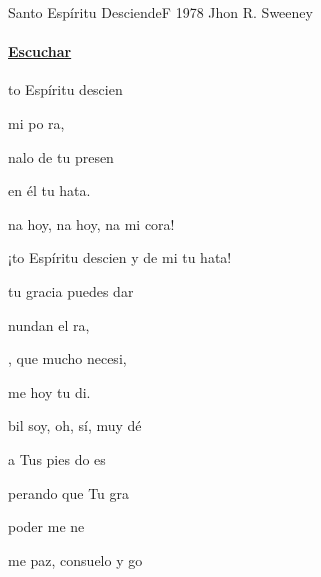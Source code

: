 \documentclass[12pt, spanish]{book}
\begin{document}
    \begin{song}{Santo Espíritu Desciende}{F}
    {1978} %
    {Jhon R. Sweeney}
    {} %
    {}
        \ifChordBk
            \paragraph{\mbox{}\hfill\protect\href{https://open.spotify.com/intl-es/track/4OhyEUIpuxNwBhsmKJCPZU}{Escuchar}\mbox{}\hfill}
        \fi

        \begin{SBOpGroup}
            to Espíritu descien

             mi po ra,

            nalo de tu presen

             en él tu hata.
        \end{SBOpGroup}

        \begin{SBChorus}
            na hoy, na hoy, na  mi cora!

            ¡to Espíritu descien y  de mi tu hata!
        \end{SBChorus}

        \begin{SBOpGroup}
             tu gracia puedes dar

            nundan el ra,

            , que mucho necesi,

            me hoy tu di.
        \end{SBOpGroup}

        \begin{SBOpGroup}
            bil soy, oh, sí, muy dé

             a Tus pies do es

            perando que Tu gra

             poder me ne 
        \end{SBOpGroup}

        \begin{SBOpGroup}
            me paz, consuelo y go


\end{SBOpGroup}
\end{song}
\end{document}
